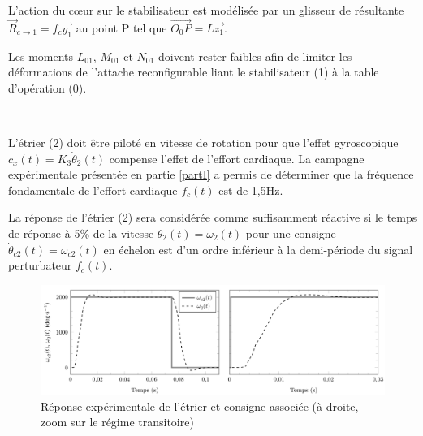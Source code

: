 L'action du c\oe ur sur le stabilisateur est modélisée par un glisseur de résultante $\overrightarrow{R}_{c\rightarrow1}=f_c\overrightarrow{y_1}$ au point P tel que $\overrightarrow{O_0P}=L\overrightarrow{z_1}$.

Les moments $L_{01}$, $M_{01}$ et $N_{01}$ doivent rester faibles afin de limiter les déformations de l'attache reconfigurable liant le stabilisateur (1) à la table d'opération (0).



~\

L'étrier (2) doit être piloté en vitesse de rotation pour que l'effet gyroscopique $c_x(t)=K_3\dot\theta_2(t)$ compense l'effet de l'effort cardiaque. La campagne expérimentale présentée en partie \ref{partI} a permis de déterminer que la fréquence fondamentale de l'effort cardiaque $f_c(t)$ est de 1,5Hz.

La réponse de l'étrier (2) sera considérée comme suffisamment réactive si le temps de réponse à 5\% de la vitesse $\dot\theta_2(t)=\omega_2(t)$ pour une consigne $\dot\theta_{c2}(t)=\omega_{c2}(t)$ en échelon est d'un ordre inférieur à la demi-période du signal perturbateur $f_c(t)$.

\begin{figure}[ht]
\begin{center}
\includegraphics[width=0.8\linewidth]{img/fig07}
\caption{Réponse expérimentale de l'étrier et consigne associée (à droite, zoom sur le régime transitoire)}
\label{fig07}
\end{center}
\end{figure}

